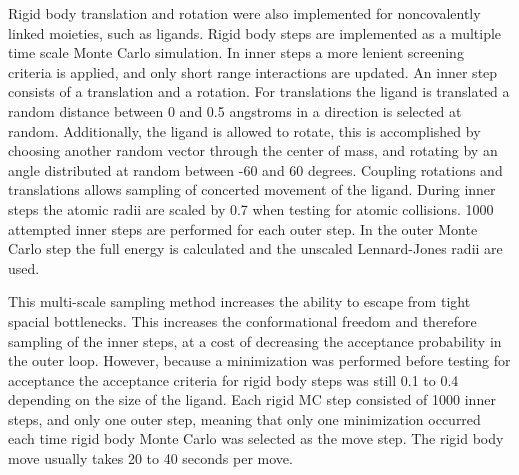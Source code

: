 Rigid body translation and rotation were also implemented for noncovalently linked moieties, such as ligands.
Rigid body steps are implemented as a multiple time scale Monte Carlo simulation.
In inner steps a more lenient screening criteria is applied, and only short range interactions are updated.
An inner step consists of a translation and a rotation.
For translations the ligand is translated a random distance between 0 and 0.5 angstroms in a direction is selected at random.
Additionally, the ligand is allowed to rotate, this is accomplished by choosing another random vector through the center of mass, and rotating by an angle distributed at random between -60 and 60 degrees.
Coupling rotations and translations allows sampling of concerted movement of the ligand.
During inner steps the atomic radii are scaled by 0.7 when testing for atomic collisions.
1000 attempted inner steps are performed for each outer step.
In the outer Monte Carlo step the full energy is calculated and the unscaled Lennard-Jones radii are used.

This multi-scale sampling method increases the ability to escape from tight spacial bottlenecks.
This increases the conformational freedom and therefore sampling of the inner steps, at a cost of decreasing the acceptance probability in the outer loop.
However, because a minimization was performed before testing for acceptance the acceptance criteria for rigid body steps was still 0.1 to 0.4 depending on the size of the ligand.
Each rigid MC step consisted of 1000 inner steps, and only one outer step, meaning that only one minimization occurred each time rigid body Monte Carlo was selected as the move step.
The rigid body move usually takes 20 to 40 seconds per move.

